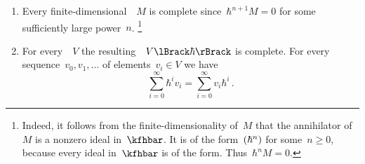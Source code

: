 \documentclass[a4paper, 11pt, oneside]{scrartcl}
\begin{document}
\begin{example}
  \leavevmode
  \begin{enumerate}
    \item
      Every finite-dimensional~\module{$\kfhbar$}~$M$ is complete since~$\hbar^{n+1} M = 0$ for some sufficiently large power~$n$.%
      \footnote{
        Indeed, it follows from the finite-dimensionality of~$M$ that the annihilator of~$M$ is a nonzero ideal in~$\kfhbar$.
        It is of the form~$(\hbar^n)$ for some~$n \geq 0$, because every ideal in~$\kfhbar$ is of the form.
        Thus~$\hbar^n M = 0$.
      }
    \item
      For every~\vectorspace{$\kf$}~$V$ the resulting~\module{$\kfhbar$}~$\power{V}{\hbar}$ is complete.
      For every sequence~$v_0, v_1, \dotsc$ of elements~$v_i \in V$ we have
      \[
        \sum_{i=0}^\infty \hbar^i v_i
        =
        \sum_{i=0}^\infty v_i \hbar^i \,.
      \]
  \end{enumerate}
\end{example}
\end{document}

